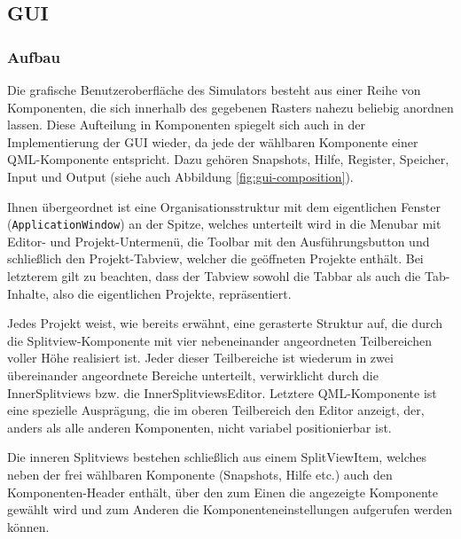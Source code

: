 \subsection{GUI}

\subsubsection{Aufbau}

Die grafische Benutzeroberfläche des Simulators besteht aus einer Reihe von
Komponenten, die sich innerhalb des gegebenen Rasters nahezu beliebig anordnen
lassen. Diese Aufteilung in Komponenten spiegelt sich auch in der
Implementierung der GUI wieder, da jede der wählbaren Komponente einer
QML-Komponente entspricht. Dazu gehören Snapshots, Hilfe, Register, Speicher,
Input und Output (siehe auch Abbildung \ref{fig:gui-composition}).

Ihnen übergeordnet ist eine Organisationsstruktur mit dem eigentlichen Fenster
(\texttt{ApplicationWindow}) an der Spitze, welches unterteilt wird in die
Menubar mit Editor- und Projekt-Untermenü, die Toolbar mit den Ausführungsbutton
und schließlich den Projekt-Tabview, welcher die geöffneten Projekte enthält.
Bei letzterem gilt zu beachten, dass der Tabview sowohl die Tabbar als auch die
Tab-Inhalte, also die eigentlichen Projekte, repräsentiert.

Jedes Projekt weist, wie bereits erwähnt, eine gerasterte Struktur auf, die
durch die Splitview-Komponente mit vier nebeneinander angeordneten Teilbereichen
voller Höhe realisiert ist. Jeder dieser Teilbereiche ist wiederum in zwei
übereinander angeordnete Bereiche unterteilt, verwirklicht durch die
InnerSplitviews bzw. die InnerSplitviewsEditor. Letztere QML-Komponente ist eine
spezielle Ausprägung, die im oberen Teilbereich den Editor anzeigt, der,
anders als alle anderen Komponenten, nicht variabel positionierbar ist.

Die inneren Splitviews bestehen schließlich aus einem SplitViewItem, welches
neben der frei wählbaren Komponente (Snapshots, Hilfe etc.) auch den
Komponenten-Header enthält, über den zum Einen die angezeigte Komponente gewählt
wird und zum Anderen die Komponenteneinstellungen aufgerufen werden können.


